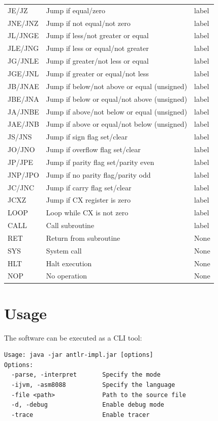\documentclass[11pt]{article}
\begin{document}
\begin{table}[H]
{\begin{tabular}{|l|l|l|}
JE/JZ & Jump if equal/zero & label \\
JNE/JNZ & Jump if not equal/not zero & label \\
JL/JNGE & Jump if less/not greater or equal & label \\
JLE/JNG & Jump if less or equal/not greater & label \\
JG/JNLE & Jump if greater/not less or equal & label \\
JGE/JNL & Jump if greater or equal/not less & label \\
JB/JNAE & Jump if below/not above or equal (unsigned) & label \\
JBE/JNA & Jump if below or equal/not above (unsigned) & label \\
JA/JNBE & Jump if above/not below or equal (unsigned) & label \\
JAE/JNB & Jump if above or equal/not below (unsigned) & label \\
JS/JNS & Jump if sign flag set/clear & label \\
JO/JNO & Jump if overflow flag set/clear & label \\
JP/JPE & Jump if parity flag set/parity even & label \\
JNP/JPO & Jump if no parity flag/parity odd & label \\
JC/JNC & Jump if carry flag set/clear & label \\
JCXZ & Jump if CX register is zero & label \\
LOOP & Loop while CX is not zero & label \\
CALL & Call subroutine & label \\
RET & Return from subroutine & None \\
SYS & System call & None \\
HLT & Halt execution & None \\
NOP & No operation & None \\
\hline
\end{tabular}
}
\end{table}

\newpage

\section{Usage}
The software can be executed as a CLI tool:

\begin{verbatim}
Usage: java -jar antlr-impl.jar [options]
Options:
  -parse, -interpret       Specify the mode
  -ijvm, -asm8088          Specify the language
  -file <path>             Path to the source file
  -d, -debug               Enable debug mode
  -trace                   Enable tracer
\end{verbatim}
\end{document}
